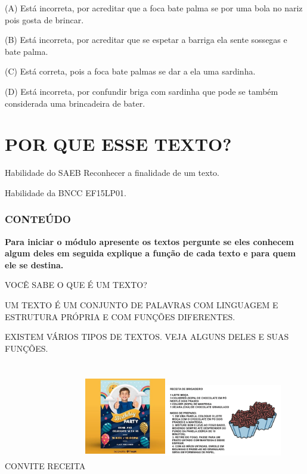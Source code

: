 \begin{escola}
(A) Está incorreta, por acreditar que a foca bate palma se por uma bola
no nariz pois gosta de brincar.

(B) Está incorreta, por acreditar que se espetar a barriga ela sente
sossegas e bate palma.

(C) Está correta, pois a foca bate palmas se dar a ela uma sardinha.

(D) Está incorreta, por confundir briga com sardinha que pode se também
considerada uma brincadeira de bater.

\chapter{POR QUE ESSE TEXTO?}

\protect\hypertarget{_heading=h.4i7ojhp}{}{}Habilidade do SAEB
Reconhecer a finalidade de um texto.

Habilidade da BNCC
EF15LP01.

\subsection{CONTEÚDO}\label{conteuxfado-3}

\textbf{Para iniciar o módulo apresente os textos pergunte se eles
conhecem algum deles em seguida explique a função de cada texto e para
quem ele se destina.}

VOCÊ SABE O QUE É UM TEXTO?

UM TEXTO É UM CONJUNTO DE PALAVRAS COM LINGUAGEM E ESTRUTURA PRÓPRIA E
COM FUNÇÕES DIFERENTES.

EXISTEM VÁRIOS TIPOS DE TEXTOS. VEJA ALGUNS DELES E SUAS FUNÇÕES.

CONVITE
RECEITA\includegraphics[width=1.39444in,height=1.86944in]{media/image132.jpg}\includegraphics[width=2.02014in,height=1.72778in]{media/image134.png}


\end{escola}
